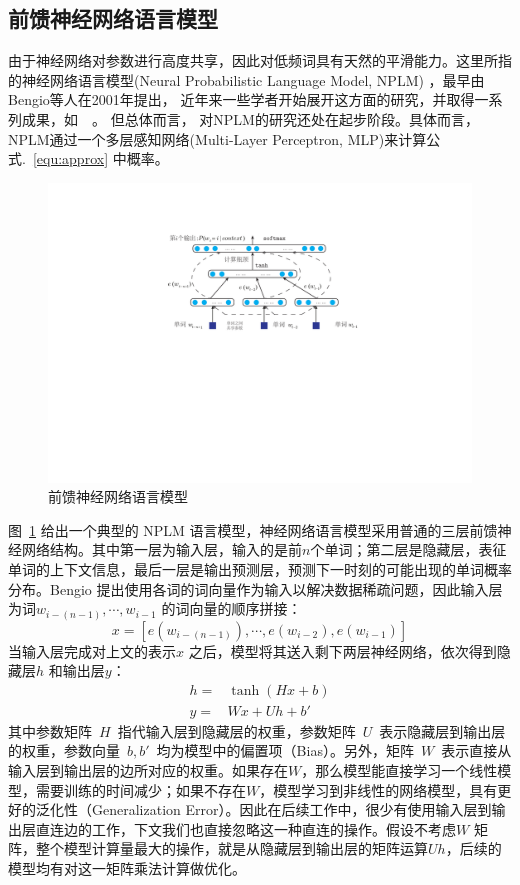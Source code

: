 \subsection{前馈神经网络语言模型}
由于神经网络对参数进行高度共享，因此对低频词具有天然的平滑能力。这里所指的神经网络语言模型(Neural Probabilistic Language Model, NPLM) ，最早由Bengio等人在2001年提出， 近年来一些学者开始展开这方面的研究，并取得一系列成果，如~\cite{DBLP:conf/acl/BaroniDK14,DBLP:journals/sigkdd/BellK07,DBLP:journals/pami/BengioCV13,DBLP:journals/tnn/BengioSF94}~。 但总体而言， 对NPLM的研究还处在起步阶段。具体而言，NPLM通过一个多层感知网络(Multi-Layer Perceptron, MLP)来计算公式.~\ref{equ:approx} 中概率。
\begin{figure}
  \centering
  \includegraphics[width=.85\linewidth]{./figures/nplm.pdf}
  \caption{前馈神经网络语言模型}\label{fig:nplm}
\end{figure}

图~\ref{fig:nplm} 给出一个典型的 NPLM 语言模型，神经网络语言模型采用普通的三层前馈神经网络结构。其中第一层为输入层，输入的是前$n$个单词；第二层是隐藏层，表征单词的上下文信息，最后一层是输出预测层，预测下一时刻的可能出现的单词概率分布。Bengio 提出使用各词的词向量作为输入以解决数据稀疏问题，因此输入层为词$w_{i-(n-1)}, \cdots,w_{i-1} $ 的词向量的顺序拼接：
\begin{equation}\label{equ:we}
  x = [e(w_{i-(n-1)}), \cdots , e(w_{i-2}), e{(w_{i-1})}]
\end{equation}
当输入层完成对上文的表示$x$ 之后，模型将其送入剩下两层神经网络，依次得到隐藏层$h$ 和输出层$y$：
\begin{equation}\label{equ:nplm}
\begin{split}
h =& \tanh(Hx+b) \\
y =&Wx + Uh +b'
\end{split}
\end{equation}
其中参数矩阵~$H$~指代输入层到隐藏层的权重，参数矩阵~$U$~表示隐藏层到输出层的权重，参数向量~$b,b'$~均为模型中的偏置项（Bias）。另外，矩阵~$W$~表示直接从输入层到输出层的边所对应的权重。如果存在$W$，那么模型能直接学习一个线性模型，需要训练的时间减少；如果不存在$W$，模型学习到非线性的网络模型，具有更好的泛化性（Generalization Error）。因此在后续工作中，很少有使用输入层到输出层直连边的工作，下文我们也直接忽略这一种直连的操作。假设不考虑$W$ 矩阵，整个模型计算量最大的操作，就是从隐藏层到输出层的矩阵运算$Uh$，后续的模型均有对这一矩阵乘法计算做优化。

